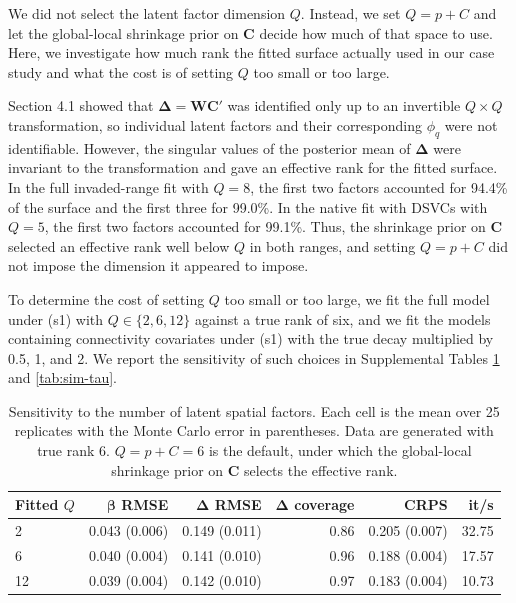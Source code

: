 \documentclass{article}
\begin{document}
We did not select the latent factor dimension $Q$. Instead, we set $Q=p+C$ and let the global-local shrinkage prior on $\mathbf{C}$ decide how much of that space to use. Here, we investigate how much rank the fitted surface actually used in our case study and what the cost is of setting $Q$ too small or too large.
 
Section 4.1 showed that $\boldsymbol\Delta=\mathbf{WC}'$ was identified only up to an invertible $Q\times Q$ transformation, so individual latent factors and their corresponding $\phi_q$ were not identifiable. 
However, the singular values of the posterior mean of $\boldsymbol\Delta$ were invariant to the transformation and gave an effective rank for the fitted surface. In the full invaded-range fit with $Q=8$, the first two factors accounted for 94.4\% of the surface and the first three for 99.0\%. In the native fit with DSVCs with $Q=5$, the first two factors accounted for 99.1\%. Thus, the shrinkage prior on $\mathbf{C}$ selected an effective rank well below $Q$ in both ranges, and setting $Q=p+C$ did not impose the dimension it appeared to impose.
 
To determine the cost of setting $Q$ too small or too large, we fit the full model under (s1) with $Q\in\{2,6,12\}$ against a true rank of six, and we fit the models containing connectivity covariates under (s1) with the true decay multiplied by 0.5, 1, and 2.
We report the sensitivity of such choices in Supplemental Tables \ref{tab:sim-Q} and \ref{tab:sim-tau}.
 
\begin{table}
\caption{Sensitivity to the number of latent spatial factors. Each cell is the mean over 25 replicates with the Monte Carlo error in parentheses. Data are generated with true rank 6. $Q = p+C=6$ is the default, under which the global-local shrinkage prior on $\mathbf{C}$ selects the effective rank.}
\label{tab:sim-Q}
\centering\small\begin{tabular}{lrrrrr}
\toprule
Fitted $Q$ & $\boldsymbol{\beta}$ RMSE & $\boldsymbol{\Delta}$ RMSE & $\boldsymbol{\Delta}$ coverage & CRPS & it/s \\
\midrule
2 & 0.043 (0.006) & 0.149 (0.011) & 0.86 & 0.205 (0.007) & 32.75 \\
6 & 0.040 (0.004) & 0.141 (0.010) & 0.96 & 0.188 (0.004) & 17.57 \\
12 & 0.039 (0.004) & 0.142 (0.010) & 0.97 & 0.183 (0.004) & 10.73 \\
\bottomrule\end{tabular}\end{table}
 
\end{document}
